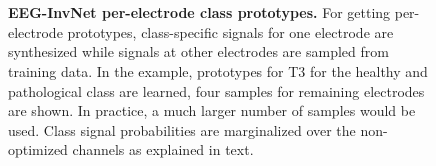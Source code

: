 \begin{figure}[htb]
    \captionsetup[subfigure]{labelformat=empty}
    \myfloatalign
     \quad
     \\
     \quad
     \\
    \caption[EEG-InvNet per-electrode class prototypes]{
    \textbf{EEG-InvNet per-electrode class prototypes.} For getting
per-electrode prototypes, class-specific signals for one electrode are
synthesized while signals at other electrodes are sampled from training
data. In the example, prototypes for T3 for the healthy and pathological
class are learned, four samples for remaining electrodes are shown. In
practice, a much larger number of samples would be used. Class signal
probabilities are marginalized over the non-optimized channels as
explained in text.
    }\label{invnet-marginal-chan-explanation-fig}
\end{figure}


